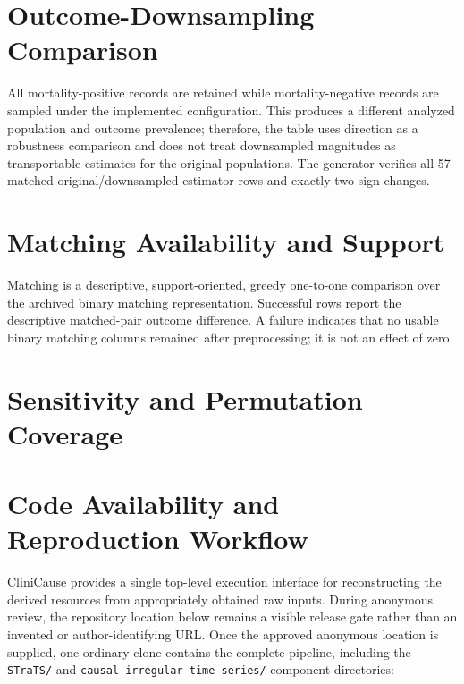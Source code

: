 \documentclass[letterpaper,10pt]{article}
\begin{document}


\section{Outcome-Downsampling Comparison}

All mortality-positive records are retained while mortality-negative records are
sampled under the implemented configuration.  This produces a different
analyzed population and outcome prevalence; therefore, the table uses direction
as a robustness comparison and does not treat downsampled magnitudes as
transportable estimates for the original populations.  The generator verifies
all 57 matched original/downsampled estimator rows and exactly two sign changes.



\section{Matching Availability and Support}

Matching is a descriptive, support-oriented, greedy one-to-one comparison over
the archived binary matching representation.  Successful rows report the
descriptive matched-pair outcome difference.  A failure indicates that no usable
binary matching columns remained after preprocessing; it is not an effect of
zero.



\section{Sensitivity and Permutation Coverage}



\section{Code Availability and Reproduction Workflow}

CliniCause provides a single top-level execution interface for reconstructing
the derived resources from appropriately obtained raw inputs. During anonymous
review, the repository location below remains a visible release gate rather
than an invented or author-identifying URL. Once the approved anonymous
location is supplied, one ordinary clone contains the complete pipeline,
including the \texttt{STraTS/} and
\texttt{causal-irregular-time-series/} component directories:
\end{document}
